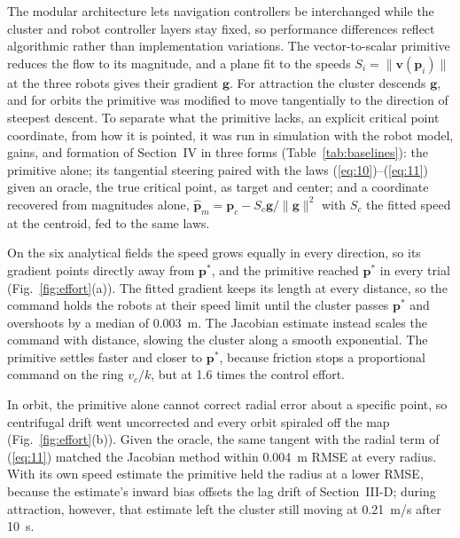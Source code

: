 \documentclass[lettersize,journal]{IEEEtran}
\newcommand{\rev}[1]{#1}
\begin{document}
The modular architecture lets navigation controllers be interchanged while the cluster and robot controller layers stay fixed, so performance differences reflect algorithmic rather than implementation variations.
The vector-to-scalar primitive \cite{48} reduces the flow to its magnitude, and a plane fit to the speeds $S_i = \|\mathbf{v}(\mathbf{p}_i)\|$ at the three robots gives their gradient $\mathbf{g}$. For attraction the cluster descends $\mathbf{g}$, and for orbits the primitive was modified to move tangentially to the direction of steepest descent. To separate what the primitive lacks, an explicit critical point coordinate, from how it is pointed, it was run in simulation with the robot model, gains, and formation of Section~IV in three forms (Table~\ref{tab:baselines}): the primitive alone; its tangential steering paired with the laws (\ref{eq:10})--(\ref{eq:11}) given an oracle, the true critical point, as target and center; and a coordinate recovered from magnitudes alone, $\hat{\mathbf{p}}_m = \mathbf{p}_c - S_c\mathbf{g}/\|\mathbf{g}\|^2$ with $S_c$ the fitted speed at the centroid, fed to the same laws.

On the six analytical fields the speed grows equally in every direction, so its gradient points directly away from $\mathbf{p}^*$, and the primitive reached $\mathbf{p}^*$ in every trial (Fig.~\ref{fig:effort}(a)). The fitted gradient keeps its length at every distance, so the command holds the robots at their speed limit until the cluster passes $\mathbf{p}^*$ and overshoots by a median of \rev{0.003}~m. The Jacobian estimate instead scales the command with distance, slowing the cluster along a smooth exponential. The primitive settles faster and closer to $\mathbf{p}^*$, because friction stops a proportional command on the ring $v_c/k$, but at \rev{1.6} times the control effort.

In orbit, the primitive alone cannot correct radial error about a specific point, so centrifugal drift went uncorrected and every orbit spiraled off the map (Fig.~\ref{fig:effort}(b)). Given the oracle, the same tangent with the radial term of (\ref{eq:11}) matched the Jacobian method within \rev{0.004}~m RMSE at every radius. With its own speed estimate the primitive held the radius at a lower RMSE, because the estimate's inward bias offsets the lag drift of Section~III-D; during attraction, however, that estimate left the cluster still moving at \rev{0.21}~m/s after 10~s.
\end{document}
